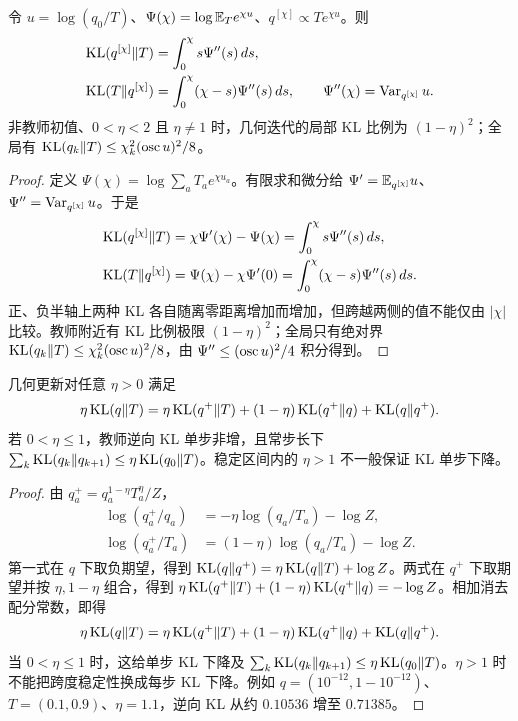 \begin{proposition}[几何路径的双向 KL 积分]
令 $u=\log(q_0/T)$、$\Psi(\chi)=\log\mathbb E_Te^{\chi u}$、$q^{[\chi]}\propto Te^{\chi u}$。则
\begin{align}
\operatorname{KL}(q^{[\chi]}\Vert T)&=\int_0^\chi s\Psi''(s)\,ds,\\
\operatorname{KL}(T\Vert q^{[\chi]})&=\int_0^\chi(\chi-s)\Psi''(s)\,ds,\qquad
\Psi''(\chi)=\operatorname{Var}_{q^{[\chi]}}u.
\end{align}
非教师初值、$0<\eta<2$ 且 $\eta\ne1$ 时，几何迭代的局部 KL 比例为 $(1-\eta)^2$；全局有 $\operatorname{KL}(q_k\Vert T)\le\chi_k^2(\operatorname{osc} u)^2/8$。
\end{proposition}
\begin{proof}
定义 $\Psi(\chi)=\log\sum_aT_ae^{\chi u_a}$。有限求和微分给 $\Psi'=\mathbb E_{q^{[\chi]}}u$、$\Psi''=\operatorname{Var}_{q^{[\chi]}}u$。于是
\begin{align}
\operatorname{KL}(q^{[\chi]}\Vert T)&=\chi\Psi'(\chi)-\Psi(\chi)
=\int_0^\chi s\Psi''(s)\,ds,\\
\operatorname{KL}(T\Vert q^{[\chi]})&=\Psi(\chi)-\chi\Psi'(0)
=\int_0^\chi(\chi-s)\Psi''(s)\,ds.
\end{align}
正、负半轴上两种 KL 各自随离零距离增加而增加，但跨越两侧的值不能仅由 $|\chi|$ 比较。教师附近有 KL 比例极限 $(1-\eta)^2$；全局只有绝对界 $\operatorname{KL}(q_k\Vert T)\le\chi_k^2(\operatorname{osc} u)^2/8$，由 $\Psi''\le(\operatorname{osc} u)^2/4$ 积分得到。
\end{proof}

\begin{proposition}[几何更新的三点恒等式]
几何更新对任意 $\eta>0$ 满足
\begin{equation}
\eta\operatorname{KL}(q\Vert T)=\eta\operatorname{KL}(q^+\Vert T)+(1-\eta)\operatorname{KL}(q^+\Vert q)+\operatorname{KL}(q\Vert q^+).
\end{equation}
若 $0<\eta\le1$，教师逆向 KL 单步非增，且常步长下 $\sum_k\operatorname{KL}(q_k\Vert q_{k+1})\le\eta\operatorname{KL}(q_0\Vert T)$。稳定区间内的 $\eta>1$ 不一般保证 KL 单步下降。
\end{proposition}
\begin{proof}
由 $q_a^+=q_a^{1-\eta}T_a^\eta/Z$，
\begin{align}
\log(q_a^+/q_a)&=-\eta\log(q_a/T_a)-\log Z,\\
\log(q_a^+/T_a)&=(1-\eta)\log(q_a/T_a)-\log Z.
\end{align}
第一式在 $q$ 下取负期望，得到 $\operatorname{KL}(q\Vert q^+)=\eta\operatorname{KL}(q\Vert T)+\log Z$。两式在 $q^+$ 下取期望并按 $\eta,1-\eta$ 组合，得到 $\eta\operatorname{KL}(q^+\Vert T)+(1-\eta)\operatorname{KL}(q^+\Vert q)=-\log Z$。相加消去配分常数，即得
\begin{equation}
\eta\operatorname{KL}(q\Vert T)=\eta\operatorname{KL}(q^+\Vert T)
+(1-\eta)\operatorname{KL}(q^+\Vert q)+\operatorname{KL}(q\Vert q^+).
\end{equation}
当 $0<\eta\le1$ 时，这给单步 KL 下降及 $\sum_k\operatorname{KL}(q_k\Vert q_{k+1})\le\eta\operatorname{KL}(q_0\Vert T)$。$\eta>1$ 时不能把跨度稳定性换成每步 KL 下降。例如 $q=(10^{-12},1-10^{-12})$、$T=(0.1,0.9)$、$\eta=1.1$，逆向 KL 从约 $0.10536$ 增至 $0.71385$。
\end{proof}

